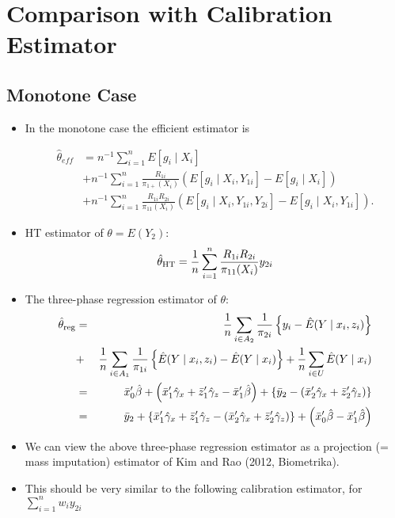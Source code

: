 
\section*{Comparison with Calibration Estimator}


\subsection*{Monotone Case}

\begin{itemize}
  \item In the monotone case the efficient estimator is 

    \begin{align*}
      \hat \theta_{eff} &= n^{-1} \sum_{i = 1}^n E[g_i \mid X_i] \\
      &+ n^{-1} \sum_{i = 1}^n \frac{R_{1i}}{\pi_{1+}(X_i)}(
        E[g_i \mid X_i, Y_{1i}] - E[g_i \mid X_i]) \\
      &+ n^{-1} \sum_{i = 1}^n \frac{R_{1i} R_{2i}}{\pi_{11}(X_i)} (
      E[g_i \mid X_i, Y_{1i}, Y_{2i}] - E[g_i \mid X_i, Y_{1i}]). 
    \end{align*}

\item HT estimator of $\theta=E(Y_2)$: 
$$ \hat{\theta}_{\rm HT} = \frac{1}{n} \sum_{i=1}^n \frac{R_{1i} R_{2i}}{ \pi_{11}(X_i) } y_{2i}  $$
\item The three-phase regression estimator of $\theta$:
\begin{eqnarray*} 
\hat{\theta}_{\rm reg} &=& \frac{1}{n} \sum_{i \in A_2}\frac{1}{ \pi_{2i}  }\left\{ y_{i}  - \hat{E} ( Y \mid x_i, z_{i} ) \right\} \\
&+& \frac{1}{n} \sum_{i \in A_1}\frac{1}{ \pi_{1i}  }\left\{ \hat{E} ( Y \mid x_i, z_{i} ) - \hat{E} ( Y \mid x_i ) \right\} + \frac{1}{n} \sum_{i \in U} \hat{E} ( Y \mid x_i ) \\
&=& \bar{x}_0' \hat{\beta} + \left( \bar{x}_1' \hat{\gamma}_x + \bar{z}_1' \hat{\gamma}_z - \bar{x}_1' \hat{\beta} \right) + \{ \bar{y}_2- (\bar{x}_2' \hat{\gamma}_x + \bar{z}_2' \hat{\gamma}_z ) \} \\
&=& \bar{y}_2 + \{ \bar{x}_1' \hat{\gamma}_x + \bar{z}_1' \hat{\gamma}_z  -  (\bar{x}_2' \hat{\gamma}_x + \bar{z}_2' \hat{\gamma}_z ) \} +\left(  \bar{x}_0' \hat{\beta} - \bar{x}_1' \hat{\beta} \right) \end{eqnarray*} 
\item We can view the above three-phase regression estimator as a projection (= mass imputation) estimator of Kim and Rao (2012, Biometrika). 
  \item This should be very similar to the following calibration estimator, for
    $\sum_{i = 1}^n w_i y_{2i}$


\end{itemize}
